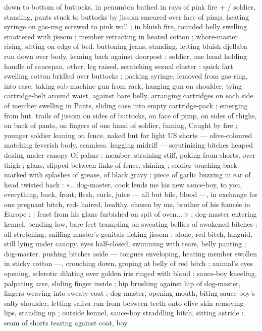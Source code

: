 down to bottom of buttocks, in penumbra bathed in rays of pink fire
+ / soldier, standing, pants stuck to buttocks by jissom smeared over
face of pimp, heating syringe on gas-ring screwed to pink wall ; in
bluish fire, rounded belly swelling smattered with jissom ; member
retracting in heated cotton ; whore-master rising, sitting on edge of
bed. buttoning jeans, standing, letting bluish djellaba run down over
body, leaning back against doorpost ; soldier, one hand holding
handle of saucepan, other, leg raised, scratching sexual cluster :
quick fart swelling cotton bridled over buttocks ; packing syringe,
femoved from gas-ring, into case, taking sub-machine gun from rack,
hanging gun on shoulder, tying cartridge-belt around waist, against
bare belly, arranging cartridges on each side of member swelling in
Pants, sliding case into empty cartridge-pack ; emerging from hut.
trails of jissom on sides of buttocks, on face of pimp, on sides of
thighs, on back of pants, on fingers of one hand of soldier, fuming,
Caught by fire ; younger soldier leaning on fence, naked but for light
US shorts --- olive-coloured matching feverish body, seamless.
hugging midriff --- scrutinizing bitches heaped dozing under canopy
Of palms : member, straining stiff, poking from shorts, over thigh ;
glans, slipped between links of fence, shining ; soldier touching back
marked with splashes of grease, of black gravy ; piece of garlic
buzzing in ear of head twisted back : «.. dog-master, cook lends me
his new sauce-boy, to you, everything, back, front, flesh, curls, juice
--- all but bile, blood ---, in exchange for one pregnant bitch, red-
haired, healthy, chosen by me, brother of his fiancée in Europe : |
feast from his glans furbished on spit of oven... » ; dog-master
entering kennel, bending low, bare feet trampling on sweating bellies
of awakened bitches : all stretching, sniffing master's genitals
licking jissom : alone, red bitch, languid, still lying under canopy.
eyes half-closed, swimming with tears, belly panting ; dog-master.
pushing bitches aside --- tongues enveloping, heating member
swollen in sticky cotton ---, crouching down, groping at belly of red
bitch ; animal's eyes opening, sclerotic dilating over golden iris
ringed with blood ; sauce-boy kneeling, palpating arse, sliding finger
inside ; hip brushing against hip of dog-master, fingers weaving into
sweaty coat ; dog-master, opening mouth, biting sauce-boy's salty
shoulder, letting saliva run from between teeth onto olive skin
removing lips, standing up ; outside kennel, sauce-boy straddling
bitch, sitting astride : seam of shorts tearing against coat, boy
